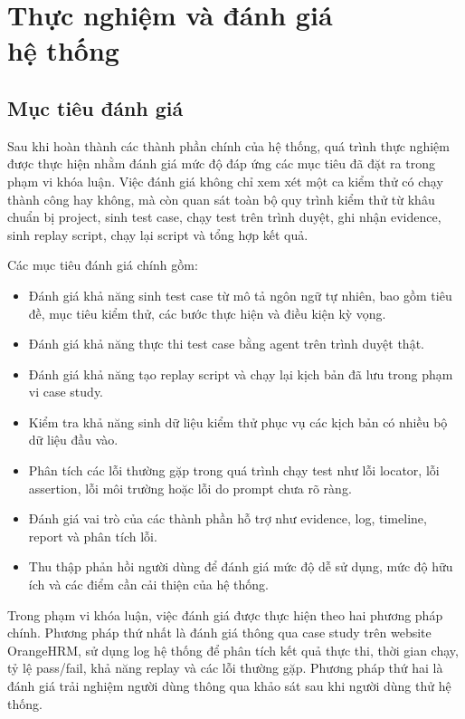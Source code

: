 
\chapter[Thực nghiệm và đánh giá hệ thống]{Thực nghiệm và đánh giá\\hệ thống}
\label{Chapter6}

\section{Mục tiêu đánh giá}

Sau khi hoàn thành các thành phần chính của hệ thống, quá trình thực nghiệm được thực hiện nhằm đánh giá mức độ đáp ứng các mục tiêu đã đặt ra trong phạm vi khóa luận. Việc đánh giá không chỉ xem xét một ca kiểm thử có chạy thành công hay không, mà còn quan sát toàn bộ quy trình kiểm thử từ khâu chuẩn bị project, sinh test case, chạy test trên trình duyệt, ghi nhận evidence, sinh replay script, chạy lại script và tổng hợp kết quả.

Các mục tiêu đánh giá chính gồm:

\begin{itemize}
    \item Đánh giá khả năng sinh test case từ mô tả ngôn ngữ tự nhiên, bao gồm tiêu đề, mục tiêu kiểm thử, các bước thực hiện và điều kiện kỳ vọng.
    \item Đánh giá khả năng thực thi test case bằng agent trên trình duyệt thật.
    \item Đánh giá khả năng tạo replay script và chạy lại kịch bản đã lưu trong phạm vi case study.
    \item Kiểm tra khả năng sinh dữ liệu kiểm thử phục vụ các kịch bản có nhiều bộ dữ liệu đầu vào.
    \item Phân tích các lỗi thường gặp trong quá trình chạy test như lỗi locator, lỗi assertion, lỗi môi trường hoặc lỗi do prompt chưa rõ ràng.
    \item Đánh giá vai trò của các thành phần hỗ trợ như evidence, log, timeline, report và phân tích lỗi.
    \item Thu thập phản hồi người dùng để đánh giá mức độ dễ sử dụng, mức độ hữu ích và các điểm cần cải thiện của hệ thống.
\end{itemize}

Trong phạm vi khóa luận, việc đánh giá được thực hiện theo hai phương pháp chính. Phương pháp thứ nhất là đánh giá thông qua case study trên website OrangeHRM, sử dụng log hệ thống để phân tích kết quả thực thi, thời gian chạy, tỷ lệ pass/fail, khả năng replay và các lỗi thường gặp. Phương pháp thứ hai là đánh giá trải nghiệm người dùng thông qua khảo sát sau khi người dùng thử hệ thống.

